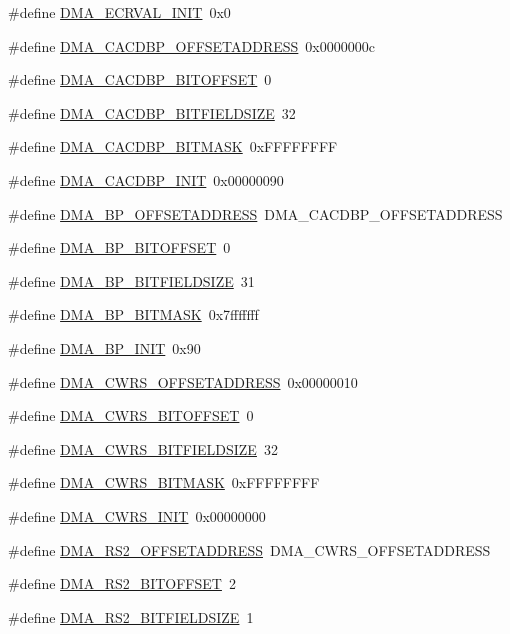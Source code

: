 \begin{DoxyCompactItemize}
\#define \hyperlink{a00547_a3f41220330670a57a67cbaab18fc5e95}{DMA\_\-ECRVAL\_\-INIT}~0x0
\item 
\#define \hyperlink{a00547_aa27683ff86911fe87d8d98d51a74800d}{DMA\_\-CACDBP\_\-OFFSETADDRESS}~0x0000000c
\item 
\#define \hyperlink{a00547_ab0eb3182f93b277d7d51d49c3f001c44}{DMA\_\-CACDBP\_\-BITOFFSET}~0
\item 
\#define \hyperlink{a00547_adc7f51f4243fb65d2a8e4c449743c5d3}{DMA\_\-CACDBP\_\-BITFIELDSIZE}~32
\item 
\#define \hyperlink{a00547_a03df02dd206bb041d832f9cbad038bc0}{DMA\_\-CACDBP\_\-BITMASK}~0xFFFFFFFF
\item 
\#define \hyperlink{a00547_a89d1fca86188262766d80354702c886e}{DMA\_\-CACDBP\_\-INIT}~0x00000090
\item 
\#define \hyperlink{a00547_aa3a17523e030ad7528d006fea3a92fad}{DMA\_\-BP\_\-OFFSETADDRESS}~DMA\_\-CACDBP\_\-OFFSETADDRESS
\item 
\#define \hyperlink{a00547_a0d06b0e33818e8168abd28cf8d627170}{DMA\_\-BP\_\-BITOFFSET}~0
\item 
\#define \hyperlink{a00547_af93275ca2ea7ba28fb05b3934cf992fc}{DMA\_\-BP\_\-BITFIELDSIZE}~31
\item 
\#define \hyperlink{a00547_ad2c65e3d63ad7b26cec172fdce245628}{DMA\_\-BP\_\-BITMASK}~0x7fffffff
\item 
\#define \hyperlink{a00547_aff9cdfce242a1dea85c03a03280b1490}{DMA\_\-BP\_\-INIT}~0x90
\item 
\#define \hyperlink{a00547_a88cc8dbd632d8174697ce8a77e166671}{DMA\_\-CWRS\_\-OFFSETADDRESS}~0x00000010
\item 
\#define \hyperlink{a00547_ad84e190579dc1c15d699d2c8ffed4697}{DMA\_\-CWRS\_\-BITOFFSET}~0
\item 
\#define \hyperlink{a00547_ac981427fe25c5e12ec664b71a9b852ae}{DMA\_\-CWRS\_\-BITFIELDSIZE}~32
\item 
\#define \hyperlink{a00547_a5e80fdf1891b59ecb90195e590e9e9ce}{DMA\_\-CWRS\_\-BITMASK}~0xFFFFFFFF
\item 
\#define \hyperlink{a00547_aada4a90fe97149be3cb8edf32137cd5b}{DMA\_\-CWRS\_\-INIT}~0x00000000
\item 
\#define \hyperlink{a00547_a71acfd5f9cdb623b78969dbf75a70fed}{DMA\_\-RS2\_\-OFFSETADDRESS}~DMA\_\-CWRS\_\-OFFSETADDRESS
\item 
\#define \hyperlink{a00547_a654dd517ba48234f2afe03fefd92c815}{DMA\_\-RS2\_\-BITOFFSET}~2
\item 
\#define \hyperlink{a00547_ac22c9357145e1a9f2d4762af98539378}{DMA\_\-RS2\_\-BITFIELDSIZE}~1

\end{DoxyCompactItemize}
